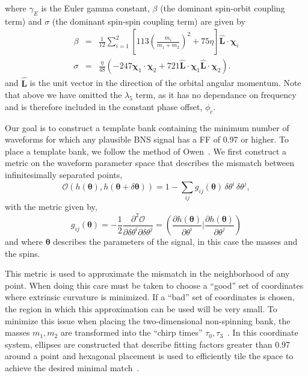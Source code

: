 where $\gamma_E$ is the Euler gamma constant, $\beta$ (the dominant spin-orbit coupling term)
and $\sigma$ (the dominant spin-spin coupling term) are given by
%
\begin{eqnarray}
\beta &=& \frac{1}{12} \sum_{i=1}^2 \left[ 113 \left(\frac{m_i}{m_1 + m_2}\right)^2 + 75 \eta \right]
\bm{\hat{L}} \cdot \bm{\chi}_i \\
\sigma &=& \frac{\eta}{48} \left( -247 \bm{\chi}_1 \cdot \bm{\chi}_2 + 721 \bm{\hat{L}}
\cdot \bm{\chi}_1 \bm{\hat{L}} \cdot \bm{\chi}_2 \right).
\end{eqnarray}
and $\bm{\hat{L}}$ is the unit vector in the direction of the orbital angular momentum.
Note that above we have omitted the $\lambda_5$ term, as it has no dependance on frequency
and is therefore included in the constant phase offset, $\phi_c$.

Our goal is to construct a template bank containing the minimum number of
waveforms for which any plausible BNS signal has a FF of 0.97 or higher.
To place a template bank, we follow the method of Owen~\cite{Owen96}. We first
construct a metric on the waveform parameter space that describes the
mismatch between infinitesimally separated points,
\begin{equation}
\mathcal{O}(h(\bm{\theta}),h(\bm{\theta}+\delta\bm{\theta})) =
  1 - \sum_{ij} g_{ij}(\bm{\theta}) \,\delta\theta^i \,\delta\theta^j,
\end{equation}
with the metric given by,
\begin{equation}
\label{eq:cbc_metric}
g_{ij}(\boldsymbol{\theta}) = - \frac{1}{2} \frac{\partial^2 \mathcal{O}}{\partial \delta\theta^i \partial
\delta\theta^j} = \left(\frac{\partial h(\boldsymbol{\theta})}{\partial \theta^i} \bigg|
\frac{\partial h(\boldsymbol{\theta})}{\partial \theta^j}\right)
\end{equation}
and where $\bm{\theta}$ describes the parameters of the signal, in this case the masses and
the spins. 

This metric is used to approximate the mismatch in the neighborhood
of any point. When doing this care must be taken to choose a ``good'' set
of coordinates where extrinsic curvature is minimized. If a ``bad'' set of
coordinates is chosen, the region in which this approximation can be used will
be very small. To minimize this issue when placing the two-dimensional
non-spinning bank, the masses $m_1, m_2$ are transformed into the ``chirp
times'' $\tau_0, \tau_3$~\cite{OwenSathyaprakash98}. In this coordinate
system, ellipses are constructed that describe fitting factors greater than 0.97
around a point and hexagonal placement is used to efficiently tile the space to
achieve the desired minimal match~\cite{Bank06}.

